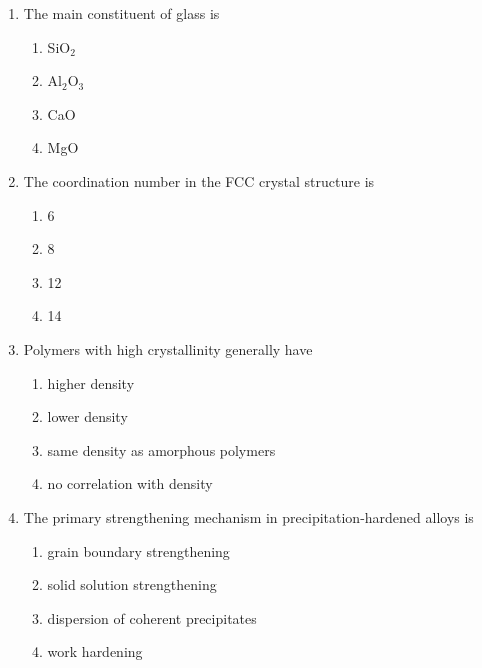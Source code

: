 \documentclass[journal,12pt,onecolumn]{IEEEtran}
\begin{document}
\begin{enumerate}[label=\arabic*)]
\newpage

\item The main constituent of glass is  
\hfill{} \\

\vspace{0.2cm}
\begin{enumerate}[label=\alph*)]
\item SiO$_2$
\item Al$_2$O$_3$
\item CaO
\item MgO
\end{enumerate}
\vspace{0.5cm}

\item The coordination number in the FCC crystal structure is  
\hfill{} \\

\vspace{0.2cm}
\begin{enumerate}[label=\alph*)]
\item 6
\item 8
\item 12
\item 14
\end{enumerate}
\vspace{0.5cm}

\item Polymers with high crystallinity generally have  
\hfill{} \\

\vspace{0.2cm}
\begin{enumerate}[label=\alph*)]
\item higher density
\item lower density
\item same density as amorphous polymers
\item no correlation with density
\end{enumerate}
\vspace{0.5cm}

\item The primary strengthening mechanism in precipitation-hardened alloys is
\hfill{} \\

\vspace{0.2cm}
\begin{enumerate}[label=\alph*)]
\item grain boundary strengthening
\item solid solution strengthening
\item dispersion of coherent precipitates
\item work hardening
\end{enumerate}

\end{enumerate}
\end{document}
